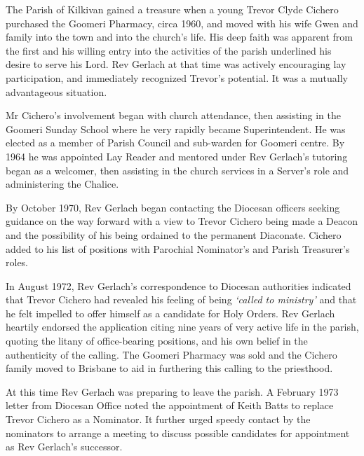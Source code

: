 The Parish of Kilkivan gained a treasure when a young Trevor Clyde Cichero purchased the Goomeri Pharmacy, circa 1960, and moved with his wife Gwen and family into the town and into the church's life. His deep faith was apparent from the first and his willing entry into the activities of the parish underlined his desire to serve his Lord. Rev Gerlach at that time was actively encouraging lay participation, and immediately recognized Trevor's potential. It was a mutually advantageous situation.



Mr Cichero's involvement began with church attendance, then assisting in the Goomeri Sunday School where he very rapidly became Superintendent. He was elected as a member of Parish Council and sub-warden for Goomeri centre. By 1964 he was appointed Lay Reader and mentored under Rev Gerlach's tutoring began as a welcomer, then assisting in the church services in a Server's role and administering the Chalice.



By October 1970, Rev Gerlach began contacting the Diocesan officers seeking guidance on the way forward with a view to Trevor Cichero being made a Deacon and the possibility of his being ordained to the permanent Diaconate. Cichero added to his list of positions with Parochial Nominator's and Parish Treasurer's roles.



In August 1972, Rev Gerlach's correspondence to Diocesan authorities indicated that Trevor Cichero had revealed his feeling of being \emph{`called to ministry'} and that he felt impelled to offer himself as a candidate for Holy Orders. Rev Gerlach heartily endorsed the application citing nine years of very active life in the parish, quoting the litany of office-bearing positions, and his own belief in the authenticity of the calling. The Goomeri Pharmacy was sold and the Cichero family moved to Brisbane to aid in furthering this calling to the priesthood.



At this time Rev Gerlach was preparing to leave the parish. A February 1973 letter from Diocesan Office noted the appointment of Keith Batts to replace Trevor Cichero as a Nominator. It further urged speedy contact by the nominators to arrange a meeting to discuss possible candidates for appointment as Rev Gerlach's successor.



